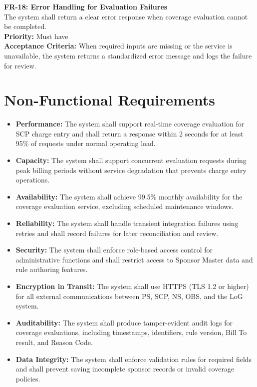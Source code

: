 \documentclass[12pt,a4paper]{article}
\begin{document}
\textbf{FR-18: Error Handling for Evaluation Failures}\\
The system shall return a clear error response when coverage evaluation cannot be completed.\\
\textbf{Priority:} Must have\\
\textbf{Acceptance Criteria:} When required inputs are missing or the service is unavailable, the system returns a standardized error message and logs the failure for review.


\section{Non-Functional Requirements}

\begin{itemize}
  \item \textbf{Performance:} The system shall support real-time coverage evaluation for SCP charge entry and shall return a response within 2 seconds for at least 95\% of requests under normal operating load.
  \item \textbf{Capacity:} The system shall support concurrent evaluation requests during peak billing periods without service degradation that prevents charge entry operations.
  \item \textbf{Availability:} The system shall achieve 99.5\% monthly availability for the coverage evaluation service, excluding scheduled maintenance windows.
  \item \textbf{Reliability:} The system shall handle transient integration failures using retries and shall record failures for later reconciliation and review.
  \item \textbf{Security:} The system shall enforce role-based access control for administrative functions and shall restrict access to Sponsor Master data and rule authoring features.
  \item \textbf{Encryption in Transit:} The system shall use HTTPS (TLS 1.2 or higher) for all external communications between PS, SCP, NS, OBS, and the LoG system.
  \item \textbf{Auditability:} The system shall produce tamper-evident audit logs for coverage evaluations, including timestamps, identifiers, rule version, Bill To result, and Reason Code.
  \item \textbf{Data Integrity:} The system shall enforce validation rules for required fields and shall prevent saving incomplete sponsor records or invalid coverage policies.

\end{itemize}
\end{document}
